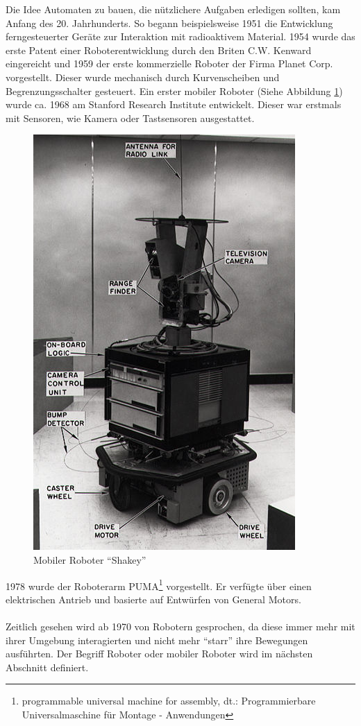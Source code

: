 Die Idee Automaten zu bauen, die nützlichere Aufgaben erledigen sollten, kam Anfang des 20. Jahrhunderts. So begann beispielsweise 1951 die Entwicklung ferngesteuerter Geräte zur Interaktion mit radioaktivem Material. 1954 wurde das erste Patent einer Roboterentwicklung durch den Briten C.W. Kenward eingereicht und 1959 der erste kommerzielle Roboter der Firma Planet Corp. vorgestellt. Dieser wurde mechanisch durch Kurvenscheiben und Begrenzungsschalter gesteuert. Ein erster mobiler Roboter (Siehe Abbildung \ref{f:shakey}) wurde ca. 1968 am Stanford Research Institute entwickelt. Dieser war erstmals mit Sensoren, wie Kamera oder Tastsensoren ausgestattet.
\begin{figure}[H]						
	\centering							
	\includegraphics[scale=1]{Bilder/shakey.jpg}			
	\caption{Mobiler Roboter "`Shakey"'}						
	\label{f:shakey}						
\end{figure}
1978 wurde der Roboterarm PUMA\footnote{programmable universal machine for assembly, dt.: Programmierbare Universalmaschine für Montage - Anwendungen} vorgestellt. Er verfügte über einen elektrischen Antrieb und basierte auf Entwürfen von General Motors.
\\
\\
Zeitlich gesehen wird ab 1970 von Robotern gesprochen, da diese immer mehr mit ihrer Umgebung interagierten und nicht mehr "`starr"' ihre Bewegungen ausführten. Der Begriff Roboter oder mobiler Roboter wird im nächsten Abschnitt definiert.
 

